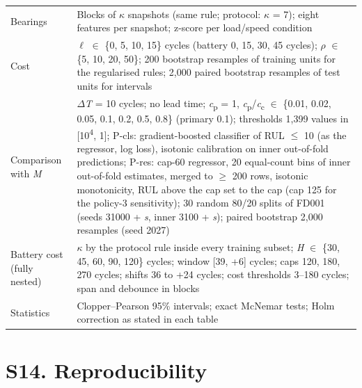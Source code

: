 \documentclass[11pt,a4paper]{article}
\begin{document}
{\begin{longtable}{@{}>{\raggedright\arraybackslash}p{}>{\raggedright\arraybackslash}p{}@{}}
Bearings & Blocks of $\kappa$ snapshots (same rule; protocol: $\kappa$ = 7); eight features per snapshot; z-score per load/speed condition \\
Cost & $\ell$ $\in$ \{0, 5, 10, 15\} cycles (battery 0, 15, 30, 45 cycles); $\rho$ $\in$ \{5, 10, 20, 50\}; 200 bootstrap resamples of training units for the regularised rules; 2,000 paired bootstrap resamples of test units for intervals \\
Comparison with \textit{M} & $\Delta$\textit{T} = 10 cycles; no lead time; \textit{c}\textsubscript{p} = 1, \textit{c}\textsubscript{p}/\textit{c}\textsubscript{c} $\in$ \{0.01, 0.02, 0.05, 0.1, 0.2, 0.5, 0.8\} (primary 0.1); thresholds 1,399 values in [10\textsuperscript{\textminus{}4}, 1]; P-cls: gradient-boosted classifier of RUL $\le$ 10 (as the regressor, log loss), isotonic calibration on inner out-of-fold predictions; P-res: cap-60 regressor, 20 equal-count bins of inner out-of-fold estimates, merged to $\ge$ 200 rows, isotonic monotonicity, RUL above the cap set to the cap (cap 125 for the policy-3 sensitivity); 30 random 80/20 splits of FD001 (seeds 31000 + \textit{s}, inner 3100 + \textit{s}); paired bootstrap 2,000 resamples (seed 2027) \\
Battery cost (fully nested) & $\kappa$ by the protocol rule inside every training subset; \textit{H} $\in$ \{30, 45, 60, 90, 120\} cycles; window [\textminus{}39, +6] cycles; caps 120, 180, 270 cycles; shifts \textminus{}36 to +24 cycles; cost thresholds 3--180 cycles; span and debounce in blocks \\
Statistics & Clopper--Pearson 95\% intervals; exact McNemar tests; Holm correction as stated in each table \\
\end{longtable}}

\section*{S14. Reproducibility}
\end{document}
